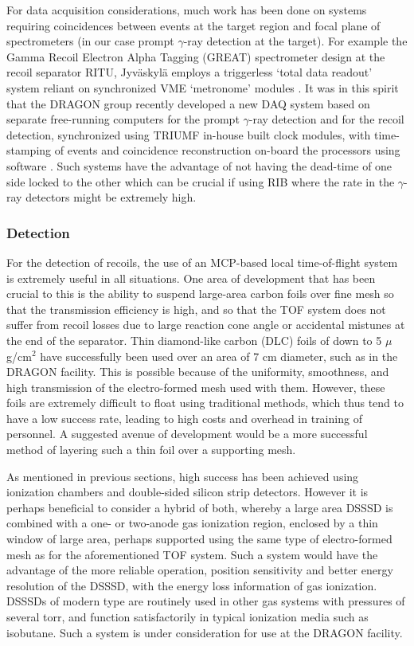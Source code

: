 For data acquisition considerations, much work has been done on systems requiring coincidences between events at the target region and focal plane of spectrometers (in our case prompt $\gamma$-ray detection at the target). For example the Gamma Recoil Electron Alpha Tagging (GREAT) spectrometer design at the recoil separator RITU, Jyv\"{a}skyl\"{a} \cite{pag03} employs a triggerless `total data readout' system reliant on synchronized VME `metronome' modules \cite{laz01}. It was in this spirit that the DRAGON group recently developed a new DAQ system based on separate free-running computers for the prompt $\gamma$-ray detection and for the recoil detection, synchronized using TRIUMF in-house built clock modules, with time-stamping of events and coincidence reconstruction on-board the processors using software \cite{chr14b}. Such systems have the advantage of not having the dead-time of one side locked to the other which can be crucial if using RIB where the rate in the $\gamma$-ray detectors might be extremely high. 

\subsubsection{Detection}

For the detection of recoils, the use of an MCP-based local time-of-flight system is extremely useful in all situations. One area of development that has been crucial to this is the ability to suspend large-area carbon foils over fine mesh so that the transmission efficiency is high, and so that the TOF system does not suffer from recoil losses due to large reaction cone angle or accidental mistunes at the end of the separator. Thin diamond-like carbon (DLC) foils of down to 5 $\mu$g/cm$^2$ have successfully been used over an area of 7 cm diameter, such as in the DRAGON facility. This is possible because of the uniformity,  smoothness, and high transmission of the electro-formed mesh used with them. However, these foils are extremely difficult to float using traditional methods, which thus tend to have a low success rate, leading to high costs and overhead in training of personnel. A suggested avenue of development would be a more successful method of layering such a thin foil over a supporting mesh. 

As mentioned in previous sections, high success has been achieved using ionization chambers and double-sided silicon strip detectors. However it is perhaps beneficial to consider a hybrid of both, whereby a large area DSSSD is combined with a one- or two-anode gas ionization region, enclosed by a thin window of large area, perhaps supported using the same type of electro-formed mesh as for the aforementioned TOF system.  Such a system would have the advantage of the more reliable operation, position sensitivity and better energy resolution of the DSSSD, with the energy loss information of gas ionization. DSSSDs of modern type are routinely used in other gas systems with pressures of several torr, and function satisfactorily in typical ionization media such as isobutane. Such a system is under consideration for use at the DRAGON facility. 

